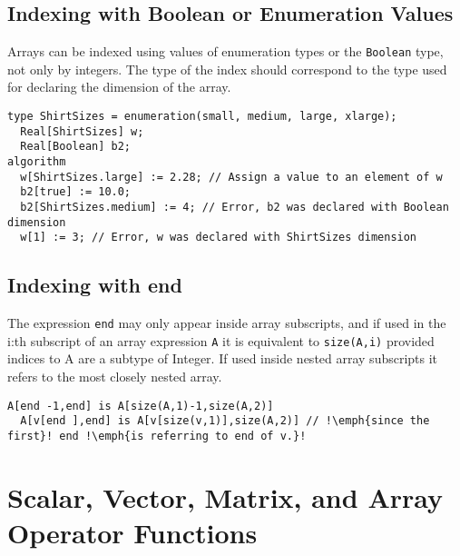 \subsection{Indexing with Boolean or Enumeration Values}

Arrays can be indexed using values of enumeration types or the \lstinline!Boolean!
type, not only by integers. The type of the index should correspond to
the type used for declaring the dimension of the array.

\begin{example}
\begin{lstlisting}[language=modelica]
  type ShirtSizes = enumeration(small, medium, large, xlarge);
  Real[ShirtSizes] w;
  Real[Boolean] b2;
algorithm
  w[ShirtSizes.large] := 2.28; // Assign a value to an element of w
  b2[true] := 10.0;
  b2[ShirtSizes.medium] := 4; // Error, b2 was declared with Boolean dimension
  w[1] := 3; // Error, w was declared with ShirtSizes dimension
\end{lstlisting}
\end{example}

\subsection{Indexing with end}

The expression \lstinline!end! may only appear inside array subscripts, and if used
in the i:th subscript of an array expression \lstinline!A! it is equivalent to
\lstinline!size(A,i)! provided indices to A are a subtype of Integer. If used inside
nested array subscripts it refers to the most closely nested array.

\begin{example}
\begin{lstlisting}[language=modelica, escapechar=!]
  A[end -1,end] is A[size(A,1)-1,size(A,2)]
  A[v[end ],end] is A[v[size(v,1)],size(A,2)] // !\emph{since the first}! end !\emph{is referring to end of v.}!
\end{lstlisting}
\end{example}

\section{Scalar, Vector, Matrix, and Array Operator Functions}

